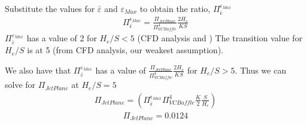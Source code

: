 \documentclass[letterpaper,10pt,english]{sphinxmanual}
\begin{document}
Substitute the values for \(\bar \varepsilon\) and
\(\varepsilon_{Max}\) to obtain the ratio,
\(\Pi_{\bar \epsilon}^{\epsilon_{Max}}\)
\begin{equation}\label{equation:Rapid_Mix/RM_Derivations:Rapid_Mix/RM_Derivations:101}
\begin{split}\Pi_{\bar \epsilon}^{\epsilon_{Max}} = \frac{\Pi_{JetPlane}}{\Pi_{VCBaffle}^4} \frac{2 H_e}{K S}\end{split}
\end{equation}
\(\Pi_{\bar \varepsilon}^{\varepsilon_{Max}}\) has a value of 2 for
\(H_e/S <5\) (CFD analysis and )
The transition value for \(H_e/S\) is at 5 (from CFD analysis, our weakest assumption).

We also have that \(\Pi_{\bar \varepsilon}^{\varepsilon_{Max}}\) has a value of
\(\frac{\Pi_{JetPlane}}{\Pi_{VCBaffle}^4} \frac{2 H_e}{K S}\) for
\(H_e/S>5\). Thus we can solve for \(\Pi_{JetPlane}\) at
\(H_e/S=5\)
\begin{equation}\label{equation:Rapid_Mix/RM_Derivations:Rapid_Mix/RM_Derivations:102}
\begin{split}\Pi_{JetPlane} = \left(
  \Pi_{\bar \epsilon}^{\epsilon_{Max}} \Pi_{VCBaffle}^4 \frac{K}{2} \frac{S}{H_e}
  \right)\end{split}
\end{equation}\begin{equation}\label{equation:Rapid_Mix/RM_Derivations:Rapid_Mix/RM_Derivations:103}
\begin{split}\Pi_{JetPlane} = 0.0124\end{split}
\end{equation}
%
\begin{sphinxVerbatim}[commandchars=\\\{\}]
    

\end{sphinxVerbatim}
\end{document}
